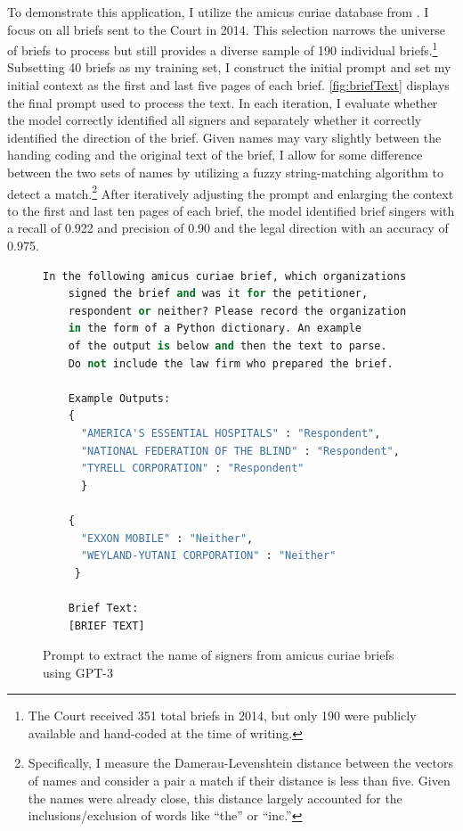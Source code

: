     To demonstrate this application, I utilize the amicus curiae database from \citet{Box-Steffensmeier:2012d}. I focus on all briefs sent to the Court in 2014. This selection narrows the universe of briefs to process but still provides a diverse sample of 190 individual briefs.\footnote{The Court received 351 total briefs in 2014, but only 190 were publicly available and hand-coded at the time of writing.} Subsetting 40 briefs as my training set, I construct the initial prompt and set my initial context as the first and last five pages of each brief. \autoref{fig:briefText} displays the final prompt used to process the text. In each iteration, I evaluate whether the model correctly identified all signers and separately whether it correctly identified the direction of the brief. Given names may vary slightly between the handing coding and the original text of the brief, I allow for some difference between the two sets of names by utilizing a fuzzy string-matching algorithm to detect a match.\footnote{Specifically, I measure the Damerau-Levenshtein distance between the vectors of names and consider a pair a match if their distance is less than five. Given the names were already close, this distance largely accounted for the inclusions/exclusion of words like “the” or “inc.”} After iteratively adjusting the prompt and enlarging the context to the first and last ten pages of each brief, the model identified brief singers with a recall of 0.922 and precision of 0.90 and the legal direction with an accuracy of 0.975.

    \begin{figure}[H]
        \centering
        \begin{lstlisting}[language=python, label={fig:brief-text}]
    In the following amicus curiae brief, which organizations 
    signed the brief and was it for the petitioner, 
    respondent or neither? Please record the organization
    in the form of a Python dictionary. An example 
    of the output is below and then the text to parse. 
    Do not include the law firm who prepared the brief.
             
    Example Outputs: 
    {
      "AMERICA'S ESSENTIAL HOSPITALS" : "Respondent",
      "NATIONAL FEDERATION OF THE BLIND" : "Respondent",
      "TYRELL CORPORATION" : "Respondent"
      }
    
    {
      "EXXON MOBILE" : "Neither",
      "WEYLAND-YUTANI CORPORATION" : "Neither"
     }
    
    Brief Text:
    [BRIEF TEXT]
    \end{lstlisting}
    \caption[Prompt to Extract Signers from Amicus Curiae Briefs Using GPT-3]{Prompt to extract the name of signers from amicus curiae briefs using GPT-3}
    \label{fig:briefText}
    \end{figure}

